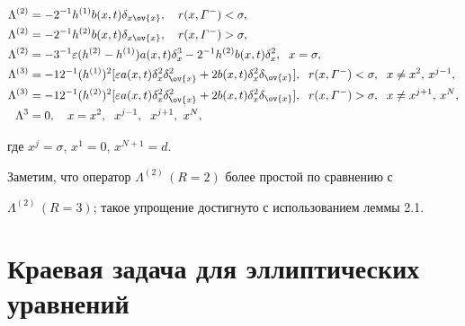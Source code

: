 \begin{equation}


\label{eq4.12}


\begin{split}


\Lambda^{(2)}&=-2^{-1}h^{(1)}b(x,t)\delta_{x\ov{x}},


\quad r(x,\varGamma^{-})<\sigma,\\


\Lambda^{(2)}&=-2^{-1}h^{(2)}b(x,t)\delta_{x\ov{x}},


\quad r(x,\varGamma^{-})>\sigma,\\


\Lambda^{(2)}&=-3^{-1}\eps(h^{(2)}-h^{(1)}) a(x,t) \delta^3_x-


2^{-1}h^{(2)} b(x,t) \delta^2_x,\ \; x=\sigma,\\


\Lambda^{(3)}&=-12^{-1}(h^{(1)})^2[\eps a(x,t)\delta_x^2\delta_{\ov{x}}^2+


2 b(x,t) \delta^2_x \delta_{\ov{x}}],\ \;


r(x,\varGamma^{-})<\sigma,\ \; x\ne x^2,\, x^{j-1}, \\


\Lambda^{(3)}&=-12^{-1}(h^{(2)})^2[\eps a(x,t)\delta^2_x \delta^2_{\ov{x}}+


2b(x,t) \delta_x^2\delta_{\ov{x}}],\ \;


r(x,\varGamma^{-})>\sigma,\ \; x\ne x^{j+1},\, x^N,\\


\Lambda^{3}&=0,\quad x=x^2,\ \; x^{j-1},\ \; x^{j+1},\ x^N,


\end{split}


\end{equation}


где $x^j=\sigma$, $x^1=0$, $x^{N+1}=d$.





Заметим, что оператор $\Lambda^{(2)}\,(R=2)$ более простой по сравнению с


$\Lambda^{(2)}\,(R=3)$; такое упрощение достигнуто с использованием леммы 2.1.





\section{Краевая задача для эллиптических уравнений}





